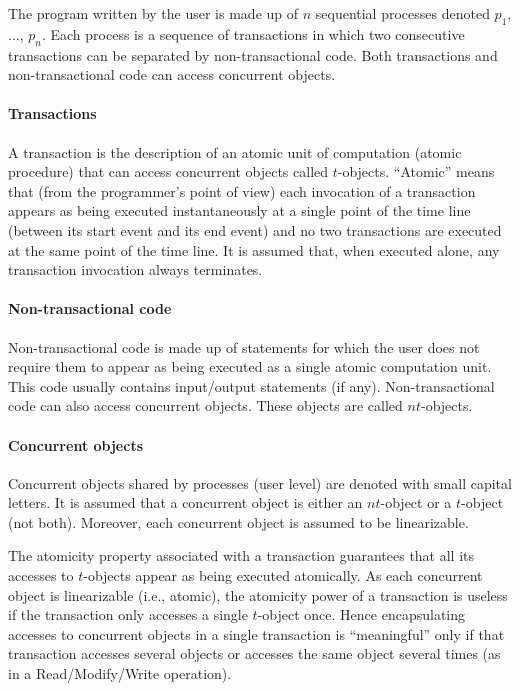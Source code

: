 The program written by the user is made up of $n$ sequential processes
denoted $p_1$, ..., $p_n$. Each process is a sequence of transactions 
in which two consecutive transactions can be separated by non-transactional 
code. Both transactions and  non-transactional code can access concurrent 
objects.

\paragraph{Transactions}
A transaction is the description of an atomic unit of computation 
(atomic procedure) that can access concurrent objects called $t$-objects. 
``Atomic'' means that (from the programmer's point of view) each 
invocation of a transaction appears as being executed 
instantaneously at a single point of  the time line (between its start event
and its end event) and no two transactions are executed at the same point 
of the time line.  It is  assumed that, when executed alone, 
any  transaction  invocation always terminates.  

\paragraph{Non-transactional code}
Non-transactional code is made up of statements for which the user does not
require  them to appear  as being  executed  as  a single  atomic computation
unit. This code usually contains input/output statements (if any). 
Non-transactional code can also access concurrent objects.  
These objects are called $nt$-objects.  

\paragraph{Concurrent objects}
Concurrent objects shared by processes (user level) are denoted with
small capital letters. It is assumed that  a concurrent object is either 
an  $nt$-object  or a  $t$-object (not both). Moreover, each 
concurrent object is assumed to be linearizable. 

The atomicity property associated with a transaction guarantees 
that all its accesses to $t$-objects appear as being executed atomically. 
As each concurrent object is linearizable (i.e., atomic), 
the atomicity power of a transaction is useless if the transaction only 
accesses  a single  $t$-object once. Hence encapsulating accesses to
concurrent objects in a single transaction is ``meaningful'' only 
if that transaction   accesses several objects or accesses the same object
several times (as in a Read/Modify/Write operation).  

